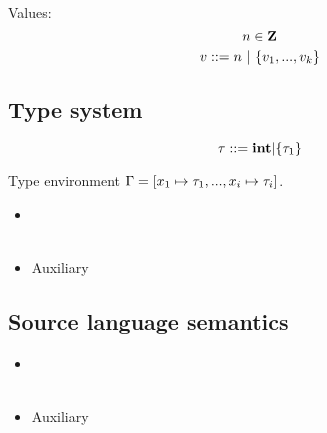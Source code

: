 Values: \\
$$ n \in \mathbf{Z} $$
$$ v::= n \ | \ \{ v_1,...,v_k \}$$

\subsection{Type system}
$$\tau ::= \mathbf{int} | \{\tau_1\}$$

Type environment $\Gamma = [x_1 \mapsto \tau_1, ..., x_i \mapsto \tau_i ]$.
\begin{itemize}

\item {}

\\[1ex]


\\[2ex]


\item Auxiliary \Jug{\Type{}{\TypeF\Tupk{\tau}}{\tau}}

\PT{\Axiom{\Type{}{\iota{\int}}{\tseq{\int}}}}
\PT{\Axiom{\Type{}{\plus{\int}{\int}}{\int}}}


\end{itemize}

\subsection{Source language semantics}
\begin{itemize}

\item {}
\\[1ex]

\\[1ex]

\item Auxiliary 


\end{itemize}

